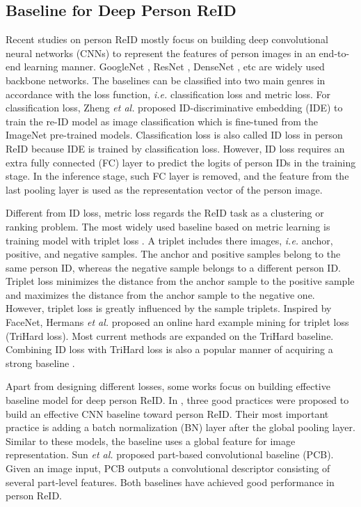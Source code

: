 \documentclass[journal]{IEEEtran}
\begin{document}
\subsection{Baseline for Deep Person ReID}
Recent studies on person ReID mostly focus on building deep convolutional neural networks (CNNs) to represent the features of person images in an end-to-end learning manner.
GoogleNet \cite{szegedy2015going}, ResNet \cite{he2016deep}, DenseNet \cite{huang2017densely}, etc are widely used backbone networks.
The baselines can be classified into two main genres in accordance with the loss function, \emph{i.e.} classification loss and metric loss.
For classification loss, Zheng \emph{et al.} \cite{zheng2018discriminatively} proposed ID-discriminative embedding (IDE) to train the re-ID model as image classification which is fine-tuned from the ImageNet \cite{deng2009imagenet} pre-trained models.
Classification loss is also called ID loss in person ReID because IDE is trained by classification loss. However, ID loss requires an extra fully connected (FC) layer to predict the logits of person IDs in the training stage. In the inference stage, such FC layer is removed, and the feature from the last pooling layer is used as the representation vector of the person image.

Different from ID loss, metric loss regards the ReID task as a clustering or ranking problem. The most widely used baseline based on metric learning is training model with triplet loss \cite{liu2017end}.
A triplet includes there images, \emph{i.e.} anchor, positive, and negative samples.
The anchor and positive samples belong to the same person ID, whereas the negative sample belongs to a different person ID. Triplet loss minimizes the distance from the anchor sample to the positive sample and maximizes the distance from the anchor sample to the negative one.
However, triplet loss is greatly influenced by the sample triplets.
Inspired by FaceNet\cite{schroff2015facenet}, Hermans \emph{et al.} proposed an online hard example mining for triplet loss (TriHard loss).
Most current methods are expanded on the TriHard baseline. Combining ID loss with TriHard loss is also a popular manner of acquiring a strong baseline \cite{LUO2019}.

Apart from designing different losses, some works focus on building effective baseline model for deep person ReID.
In \cite{xiong2019good}, three good practices were proposed to build an effective CNN baseline toward person ReID. Their most important practice is adding a batch normalization (BN) layer after the global pooling layer. Similar to these models, the baseline uses a global feature for image representation.
Sun \emph{et al.} \cite{sun2018beyond} proposed part-based convolutional baseline (PCB). Given an image input, PCB outputs a convolutional descriptor consisting of several part-level features. Both baselines have achieved good performance in person ReID.
\end{document}

